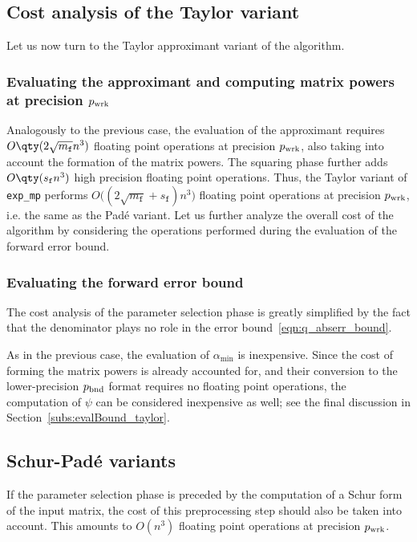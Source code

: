 \subsection{Cost analysis of the Taylor variant}
Let us now turn to the Taylor approximant variant of the algorithm. 

\subsubsection{Evaluating the approximant and computing matrix powers at precision \texorpdfstring{$p_{\textup{wrk}}$}{p_wrk}}
Analogously to the previous case, the evaluation of the approximant requires $O\qty(2\sqrt{m_{\mathtt{f}}}n^3)$ floating point operations at precision $p_{\textup{wrk}}$, also taking into account the formation of the matrix powers. The squaring phase further adds $O\qty(s_{\mathtt{f}}n^3)$ high precision floating point operations. Thus, the Taylor variant of \texttt{exp\_mp} performs $O\big((2\sqrt{m_{\mathtt{f}}}+s_{\mathtt{f}})n^3\big)$ floating point operations at precision $p_{\textup{wrk}}$, i.e. the same as the Padé variant. Let us further analyze the overall cost of the algorithm by considering the operations performed during the evaluation of the forward error bound.

\subsubsection{Evaluating the forward error bound}
The cost analysis of the parameter selection phase is greatly simplified by the fact that the denominator plays no role in the error bound~\eqref{eqn:q_abserr_bound}.

As in the previous case, the evaluation of $\alpha_{\min}$ is inexpensive. Since the cost of forming the matrix powers is already accounted for, and their conversion to the lower-precision $p_{\textup{bnd}}$ format requires no floating point operations, the computation of $\psi$ can be considered inexpensive as well; see the final discussion in Section~\ref{subs:evalBound_taylor}.

\subsection{Schur-Padé variants}
If the parameter selection phase is preceded by the computation of a Schur form of the input matrix, the cost of this preprocessing step should also be taken into account. This amounts to $O(n^3)$ floating point operations at precision $p_{\textup{wrk}}$. 
